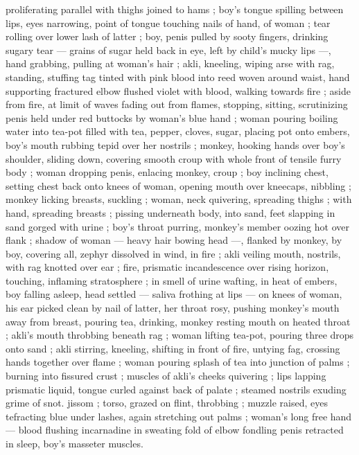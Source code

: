 proliferating parallel with thighs joined to hams ; boy's tongue 
spilling between lips, eyes narrowing, point of tongue touching nails 
of hand, of woman ; tear rolling over lower lash of latter ; boy, penis 
pulled by sooty fingers, drinking sugary tear --- grains of sugar held 
back in eye, left by child's mucky lips ---, hand grabbing, pulling at 
woman's hair ; akli, kneeling, wiping arse with rag, standing, stuffing 
tag tinted with pink blood into reed woven around waist, hand 
supporting fractured elbow flushed violet with blood, walking 
towards fire ; aside from fire, at limit of waves fading out from 
flames, stopping, sitting, scrutinizing penis held under red buttocks 
by woman's blue hand ; woman pouring boiling water into tea-pot 
filled with tea, pepper, cloves, sugar, placing pot onto embers, boy's 
mouth rubbing tepid over her nostrils ; monkey, hooking hands over 
boy's shoulder, sliding down, covering smooth croup with whole front 
of tensile furry body ; woman dropping penis, enlacing monkey, 
croup ; boy inclining chest, setting chest back onto knees of woman, 
opening mouth over kneecaps, nibbling ; monkey licking breasts, 
suckling ; woman, neck quivering, spreading thighs ; with hand, 
spreading breasts ; pissing underneath body, into sand, feet 
slapping in sand gorged with urine ; boy's throat purring, monkey's 
member oozing hot over flank ; shadow of woman --- heavy hair 
bowing head ---, flanked by monkey, by boy, covering all, zephyr 
dissolved in wind, in fire ; akli veiling mouth, nostrils, with rag 
knotted over ear ; fire, prismatic incandescence over rising horizon, 
touching, inflaming stratosphere ; in smell of urine wafting, in heat 
of embers, boy falling asleep, head settled --- saliva frothing at lips 
--- on knees of woman, his ear picked clean by nail of latter, her 
throat rosy, pushing monkey's mouth away from breast, pouring tea, 
drinking, monkey resting mouth on heated throat ; akli's mouth 
throbbing beneath rag ; woman lifting tea-pot, pouring three drops 
onto sand ; akli stirring, kneeling, shifting in front of fire, untying 
fag, crossing hands together over flame ; woman pouring splash of 
tea into junction of palms ; burning into fissured crust ; muscles of 
akli's cheeks quivering ; lips lapping prismatic liquid, tongue curled 
against back of palate ; steamed nostrils exuding grime of snot. 
jissom ; torso, grazed on flint, throbbing ; muzzle raised, eyes 
tefracting blue under lashes, again stretching out palms ; woman's 
long free hand --- blood flushing incarnadine in sweating fold of 
elbow fondling penis retracted in sleep, boy's masseter muscles. 
